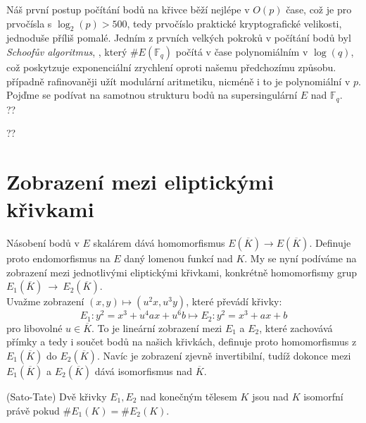 \documentclass [12pt]{report}
\begin{document}
Náš první postup počítání bodů na křivce běží nejlépe v $O(p)$ čase, což je pro prvočísla s $\log_2(p) > 500$, tedy prvočíslo praktické kryptografické velikosti, jednoduše příliš pomalé. Jedním z prvních velkých pokroků v počítání bodů byl \textit{Schoofův algoritmus}, \cite{Schoof}, který $\# E(\mathbb{F}_q)$ počítá v čase polynomiálním v $\log(q)$, což poskytzuje exponenciální zrychlení oproti našemu předchozímu způsobu.\\ 

 případně rafinovaněji užít modulární aritmetiku, nicméně i to je polynomiální v $p$. \\





Pojďme se podívat na samotnou strukturu bodů na supersingulární $E$ nad $\mathbb{F}_q$. \\

??

??
\section{Zobrazení mezi eliptickými křivkami}

Násobení bodů v $E$ skalárem dává homomorfismus $E(\overline{K}) \longrightarrow E(\overline{K})$. Definuje proto endomorfismus na $E$ daný lomenou funkcí nad $K$. My se nyní podíváme na zobrazení mezi jednotlivými eliptickými křivkami, konkrétně homomorfismy grup $E_1(\overline{K})~\longrightarrow~E_2(\overline{K})$.\\

Uvažme zobrazení $(x,y) \mapsto (u^2 x, u^3 y)$, které převádí křivky:
\begin{equation*}
E_1 : y^2 = x^3 + u^4 a x + u^6 b \mapsto E_2 :  y^2 = x^3 + ax + b 
\end{equation*}
pro libovolné $u \in \overline{K}$. To je lineární zobrazení mezi $E_1$ a $E_2$, které zachovává přímky a tedy i součet bodů na našich křivkách, definuje proto homomorfismus z $E_1(\overline{K})$ do $E_2(\overline{K})$. Navíc je zobrazení zjevně invertibilní, tudíž dokonce mezi $E_1(\overline{K})$ a $E_2(\overline{K})$ dává isomorfismus nad $\overline{K}$.

\begin{veta} (Sato-Tate)
Dvě křivky $E_1,E_2$ nad konečným tělesem $K$ jsou nad $K$ isomorfní právě pokud $\# E_1(K) = \# E_2(K)$.
\end{veta}
\end{document}

